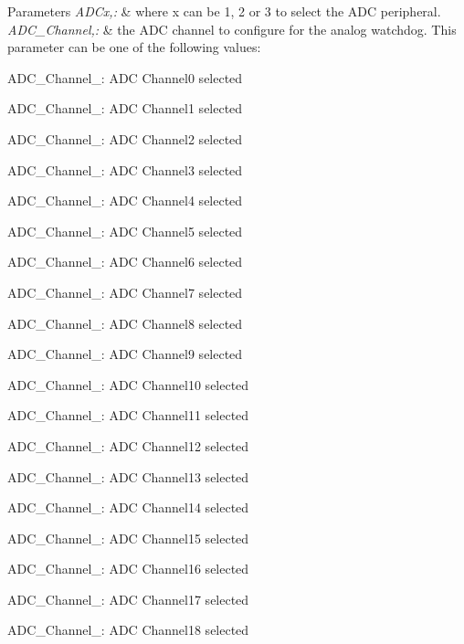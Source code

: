 \begin{DoxyParams}{Parameters}
{\em A\-D\-Cx,\-:} & where x can be 1, 2 or 3 to select the A\-D\-C peripheral. \\
\hline
{\em A\-D\-C\-\_\-\-Channel,\-:} & the A\-D\-C channel to configure for the analog watchdog. This parameter can be one of the following values\-: \begin{DoxyItemize}
\item A\-D\-C\-\_\-\-Channel\-\_\-: A\-D\-C Channel0 selected \item A\-D\-C\-\_\-\-Channel\-\_\-: A\-D\-C Channel1 selected \item A\-D\-C\-\_\-\-Channel\-\_\-: A\-D\-C Channel2 selected \item A\-D\-C\-\_\-\-Channel\-\_\-: A\-D\-C Channel3 selected \item A\-D\-C\-\_\-\-Channel\-\_\-: A\-D\-C Channel4 selected \item A\-D\-C\-\_\-\-Channel\-\_\-: A\-D\-C Channel5 selected \item A\-D\-C\-\_\-\-Channel\-\_\-: A\-D\-C Channel6 selected \item A\-D\-C\-\_\-\-Channel\-\_\-: A\-D\-C Channel7 selected \item A\-D\-C\-\_\-\-Channel\-\_\-: A\-D\-C Channel8 selected \item A\-D\-C\-\_\-\-Channel\-\_\-: A\-D\-C Channel9 selected \item A\-D\-C\-\_\-\-Channel\-\_\-: A\-D\-C Channel10 selected \item A\-D\-C\-\_\-\-Channel\-\_\-: A\-D\-C Channel11 selected \item A\-D\-C\-\_\-\-Channel\-\_\-: A\-D\-C Channel12 selected \item A\-D\-C\-\_\-\-Channel\-\_\-: A\-D\-C Channel13 selected \item A\-D\-C\-\_\-\-Channel\-\_\-: A\-D\-C Channel14 selected \item A\-D\-C\-\_\-\-Channel\-\_\-: A\-D\-C Channel15 selected \item A\-D\-C\-\_\-\-Channel\-\_\-: A\-D\-C Channel16 selected \item A\-D\-C\-\_\-\-Channel\-\_\-: A\-D\-C Channel17 selected \item A\-D\-C\-\_\-\-Channel\-\_\-: A\-D\-C Channel18 selected \end{DoxyItemize}
\\
\hline
\end{DoxyParams}

